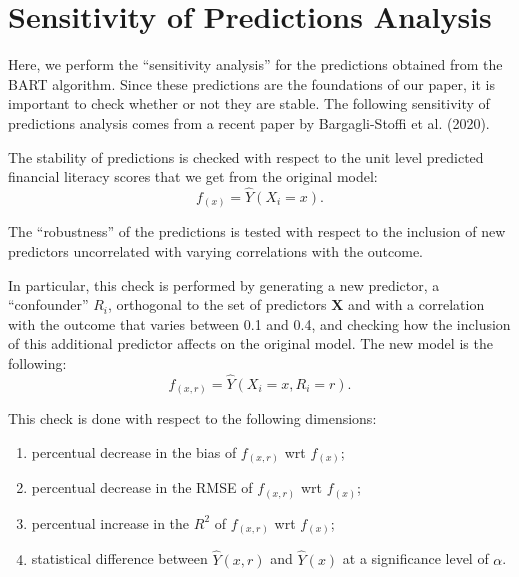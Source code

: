 \documentclass[]{article}
\begin{document}
\hypertarget{sensitivity-of-predictions-analysis}{%
\section{Sensitivity of Predictions
Analysis}\label{sensitivity-of-predictions-analysis}}

Here, we perform the ``sensitivity analysis'' for the predictions
obtained from the BART algorithm. Since these predictions are the
foundations of our paper, it is important to check whether or not they
are stable. The following sensitivity of predictions analysis comes from
a recent paper by Bargagli-Stoffi et al. (2020).

The stability of predictions is checked with respect to the unit level
predicted financial literacy scores that we get from the original model:
\begin{equation}
 f_(x) = \hat{Y}(X_i=x).
\end{equation}

\par

The ``robustness'' of the predictions is tested with respect to the
inclusion of new predictors uncorrelated with varying correlations with
the outcome.

\par

In particular, this check is performed by generating a new predictor, a
``confounder'' \(R_i\), orthogonal to the set of predictors
\(\mathbf{X}\) and with a correlation with the outcome that varies
between 0.1 and 0.4, and checking how the inclusion of this additional
predictor affects on the original model. The new model is the following:
\begin{equation}
 f_(x,r) = \hat{Y}(X_i=x, R_i=r).
\end{equation}

This check is done with respect to the following dimensions:

\begin{enumerate}
 \item percentual decrease in the bias of $f_(x,r)$ wrt $f_(x)$;
 \item percentual decrease in the RMSE of $f_(x,r)$ wrt $f_(x)$;
 \item percentual increase in the $R^2$ of $f_(x,r)$ wrt $f_(x)$;
 \item statistical difference between $\hat{Y}(x,r)$ and $\hat{Y}(x)$ at a significance level of $\alpha$.
\end{enumerate}
\end{document}
